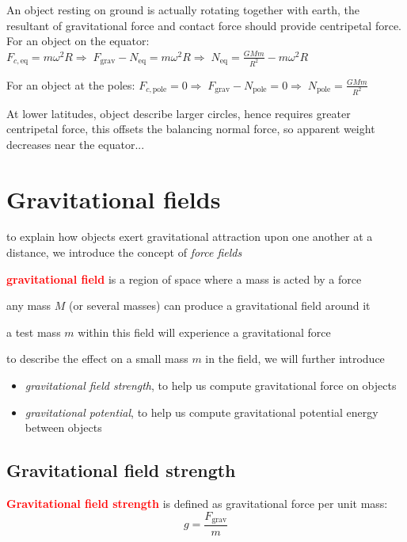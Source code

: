 \documentclass[a4paper,12pt]{book}
\newenvironment{ilight}
  {\centering
  	\vspace*{6pt}
  	\begin{tcolorbox}[colframe=Gray,colback=LightGrey!15]
  \setlength{\baselineskip}{\baselineskip}%
  }
  {\end{tcolorbox}\vspace*{-4pt}}
\newcommand{\keypoint}[1]{\textbf{\textcolor{red}{#1}}}
\newcommand{\rcyskip}{\vspace{4pt}}
\newcommand{\RA}{\Rightarrow\;}
\newcommand{\tcbhighmath}[1]{\boxed{#1}}
\newcommand{\keypoint}[1]{\textbf{\textcolor{red}{#1}}}
\begin{document}
An object resting on ground is actually rotating together with earth, the resultant of gravitational force and contact force should provide centripetal force. For an object on the equator: $F_{c,\text{eq}} = m\omega^2 R \RA F_\text{grav} - N_\text{eq} = m \omega^2 R  \RA N_\text{eq} = \frac{GMm}{R^2} - m \omega^2 R$

For an object at the poles: $F_{c,\text{pole}} = 0 \RA F_\text{grav} - N_\text{pole} = 0  \RA N_\text{pole} = \frac{GMm}{R^2}$

At lower latitudes, object describe larger circles, hence requires greater centripetal force, this offsets the balancing normal force, so apparent weight decreases near the equator...

\section{Gravitational fields}

to explain how objects exert gravitational attraction upon one another at a distance, we introduce the concept of \emph{force fields}

\begin{ilight}
	\keypoint{gravitational field} is a region of space where a mass is acted by a force
\end{ilight}

any mass $M$ (or several masses) can produce a gravitational field around it

a test mass $m$ within this field will experience a gravitational force

\vspace*{\baselineskip}

to describe the effect on a small mass $m$ in the field, we will further introduce
\begin{itemize}
	\item[-] \emph{gravitational field strength}, to help us compute gravitational force on objects
	
	\item[-] \emph{gravitational potential}, to help us compute gravitational potential energy between objects
\end{itemize}

\subsection{Gravitational field strength}

\rcyskip

\begin{ilight}
	\keypoint{Gravitational field strength} is defined as gravitational force per unit mass: $$\tcbhighmath{g=\frac{F_\text{grav}}{m}}$$
\end{ilight}
\end{document}
